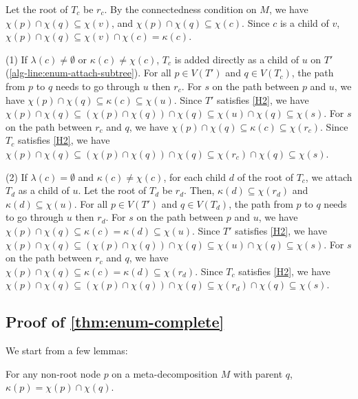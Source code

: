     Let the root of $T_c$ be $r_c$.
    By the connectedness condition on $M$, we have $\chi(p) \cap \chi(q) \subseteq \chi(v)$, and $\chi(p) \cap \chi(q) \subseteq \chi(c)$. Since $c$ is a child of $v$, $\chi(p) \cap \chi(q) \subseteq \chi(v) \cap \chi(c) = \kappa(c)$.
    
    (1) If $\lambda(c) \neq \emptyset$ or $\kappa(c) \neq \chi(c)$, $T_c$ is added directly as a child of $u$ on $T'$ (\cref{alg-line:enum-attach-subtree}).
    For all $p \in V(T')$ and $q \in V(T_c)$, the path from $p$ to $q$ needs to go through $u$ then $r_c$.
    For $s$ on the path between $p$ and $u$, we have $\chi(p) \cap \chi(q) \subseteq \kappa(c) \subseteq \chi(u)$.
    Since $T'$ satisfies \ref{H2}, we have $\chi(p) \cap \chi(q) \subseteq (\chi(p) \cap \chi(q)) \cap \chi(q) \subseteq \chi(u) \cap \chi(q) \subseteq \chi(s)$.
    For $s$ on the path between $r_c$ and $q$, we have $\chi(p) \cap \chi(q) \subseteq \kappa(c) \subseteq \chi(r_c)$.
    Since $T_c$ satisfies \ref{H2}, we have $\chi(p) \cap \chi(q) \subseteq (\chi(p) \cap \chi(q)) \cap \chi(q) \subseteq \chi(r_c) \cap \chi(q) \subseteq \chi(s)$.
    
    (2) If $\lambda(c) = \emptyset$ and $\kappa(c) \neq \chi(c)$, for each child $d$ of the root of $T_c$, we attach $T_d$ as a child of $u$. Let the root of $T_d$ be $r_d$. Then, $\kappa(d) \subseteq \chi(r_d)$ and $\kappa(d) \subseteq \chi(u)$.
    For all $p \in V(T')$ and $q \in V(T_d)$, the path from $p$ to $q$ needs to go through $u$ then $r_d$.
    For $s$ on the path between $p$ and $u$, we have $\chi(p) \cap \chi(q) \subseteq \kappa(c) = \kappa(d) \subseteq \chi(u)$.
    Since $T'$ satisfies \ref{H2}, we have $\chi(p) \cap \chi(q) \subseteq (\chi(p) \cap \chi(q)) \cap \chi(q) \subseteq \chi(u) \cap \chi(q) \subseteq \chi(s)$.
    For $s$ on the path between $r_c$ and $q$, we have $\chi(p) \cap \chi(q) \subseteq \kappa(c) = \kappa(d) \subseteq \chi(r_d)$.
    Since $T_c$ satisfies \ref{H2}, we have $\chi(p) \cap \chi(q) \subseteq (\chi(p) \cap \chi(q)) \cap \chi(q) \subseteq \chi(r_d) \cap \chi(q) \subseteq \chi(s)$.
    
\subsection{Proof of \cref{thm:enum-complete}}

We start from a few lemmas:

\begin{lemma} \label{lem:kappa}
    For any non-root node $p$ on a meta-decomposition $M$ with parent $q$, $\kappa(p) = \chi(p) \cap \chi(q)$.
\end{lemma}

